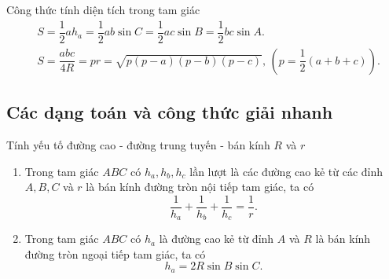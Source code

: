\begin{dl} Công thức tính diện tích  trong tam giác\\
$$\begin{aligned}
& {S=\dfrac{1}{2} ah_a =\dfrac{1}{2} ab\sin C=\dfrac{1}{2} ac\sin B=\dfrac{1}{2} bc\sin A}. \\ 
&{S=\dfrac{abc}{4R} =pr=\sqrt{p\left(p-a\right)\left(p-b\right)\left(p-c\right)} , \,\left(p=\dfrac{1}{2} \left(a+b+c\right)\right).} 
\end{aligned}$$
\end{dl}


\subsection{Các dạng toán và công thức giải nhanh}


\begin{dang}{Tính yếu tố đường cao - đường trung tuyến - bán kính $R$ và $r$}
	\begin{enumerate}
		\item Trong tam giác $ABC$ có  $h_a,h_b,h_c$ lần lượt là các đường cao kẻ từ các đỉnh $A,B,C$ và $r$ là bán kính đường tròn nội tiếp tam giác, ta có $$\dfrac{1}{h_a}+\dfrac{1}{h_b}+\dfrac{1}{h_c}=\dfrac{1}{r}.$$
		\item Trong tam giác $ABC$ có $h_a$ là đường cao kẻ từ đỉnh $A$ và $R$ là bán kính đường tròn ngoại tiếp tam giác, ta có
		$$h_a=2R\sin B\sin C.$$
		

\end{enumerate}
\end{dang}
